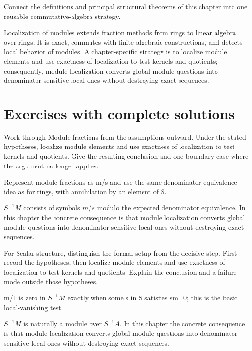 \begin{problem}\label{prob:v07-problem-12}
Connect the definitions and principal structural theorems of this chapter into one reusable commutative-algebra strategy.
\end{problem}
\begin{solution}
Localization of modules extends fraction methods from rings to linear algebra over rings. It is exact, commutes with finite algebraic constructions, and detects local behavior of modules. A chapter-specific strategy is to localize module elements and use exactness of localization to test kernels and quotients; consequently, module localization converts global module questions into denominator-sensitive local ones without destroying exact sequences.
\end{solution}

\section{Exercises with complete solutions}

\begin{exercise}\label{exr:v07-01}
Work through Module fractions from the assumptions outward. Under the stated hypotheses, localize module elements and use exactness of localization to test kernels and quotients. Give the resulting conclusion and one boundary case where the argument no longer applies.
\end{exercise}
\begin{hint}
Represent module fractions as m/s and use the same denominator-equivalence idea as for rings, with annihilation by an element of S.
\end{hint}
\begin{solution}
$S^{-1}M$ consists of symbols $m/s$ modulo the expected denominator equivalence. In this chapter the concrete consequence is that module localization converts global module questions into denominator-sensitive local ones without destroying exact sequences.
\end{solution}

\begin{exercise}\label{exr:v07-02}
For Scalar structure, distinguish the formal setup from the decisive step. First record the hypotheses; then localize module elements and use exactness of localization to test kernels and quotients. Explain the conclusion and a failure mode outside those hypotheses.
\end{exercise}
\begin{hint}
m/1 is zero in \(S^{-1}M\) exactly when some s in S satisfies sm=0; this is the basic local-vanishing test.
\end{hint}
\begin{solution}
$S^{-1}M$ is naturally a module over $S^{-1}A$. In this chapter the concrete consequence is that module localization converts global module questions into denominator-sensitive local ones without destroying exact sequences.
\end{solution}

